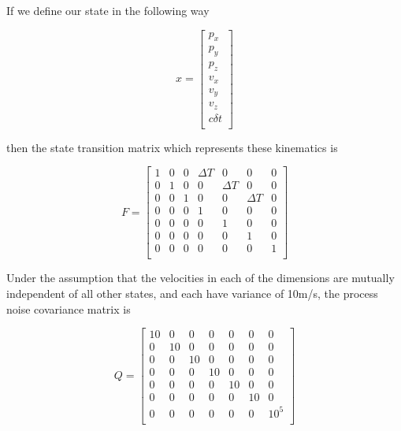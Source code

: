 \documentclass[11pt]{article}
\begin{document}
\begin{enumerate}
{If we define our state in the following way

\[
   x =
  \left[ {\begin{array}{c}
   p_x \\
   p_y \\
   p_z \\
   v_x \\
   v_y \\
   v_z \\
   c \delta t \\
  \end{array} } \right]
  
\]

then the state transition matrix which represents these kinematics is

\[
   F =
   \left[ {\begin{array}{ccccccc}
    1 & 0 & 0 & \Delta T & 0 & 0 & 0 \\
    0 & 1 & 0 & 0 & \Delta T & 0 & 0 \\
    0 & 0 & 1 & 0 & 0 & \Delta T & 0 \\
    0 & 0 & 0 & 1 & 0 & 0 & 0 \\
    0 & 0 & 0 & 0 & 1 & 0 & 0 \\
    0 & 0 & 0 & 0 & 0 & 1 & 0 \\
    0 & 0 & 0 & 0 & 0 & 0 & 1 \\
  \end{array} } \right]
  
\]

Under the assumption that the velocities in each of the dimensions are mutually independent of all other states, and each have variance of 10m/s, the process noise covariance matrix is

\[
   Q =
   \left[ {\begin{array}{ccccccc}
    10 & 0 & 0 & 0 & 0 & 0 & 0 \\
    0 & 10 & 0 & 0 & 0 & 0 & 0 \\
    0 & 0 & 10 & 0 & 0 & 0 & 0 \\
    0 & 0 & 0 & 10 & 0 & 0 & 0 \\
    0 & 0 & 0 & 0 & 10 & 0 & 0 \\
    0 & 0 & 0 & 0 & 0 & 10 & 0 \\
    0 & 0 & 0 & 0 & 0 & 0 & 10^5 \\
  \end{array} } \right]
  
\]

}

\end{enumerate}
\end{document}
